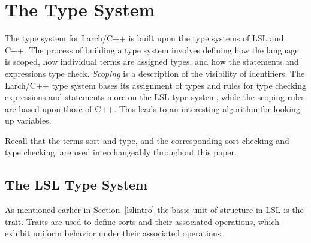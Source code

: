 \section{The Type System}
\label{typesystem}
The type system for Larch/C++ is built upon the type systems of LSL
and C++. The process of building a type system involves defining how
the language is scoped, how individual terms are assigned types, and
how the statements and expressions type check. \emph{Scoping} is a
description of the visibility of identifiers. The Larch/C++ type
system bases its assignment of types and rules for type checking
expressions and statements more on the LSL type system, while the
scoping rules are based upon those of C++. This leads to an
interesting algorithm for looking up variables.

Recall that the terms sort and type, and the corresponding
sort checking and type checking, are used interchangeably throughout
this paper.

\subsection{The LSL Type System}
\label{lslts}
As mentioned earlier in Section~\ref{lslintro} the basic unit of
structure in LSL is the trait. Traits are used to define sorts and
their associated operations, which exhibit uniform behavior under
their associated operations.

